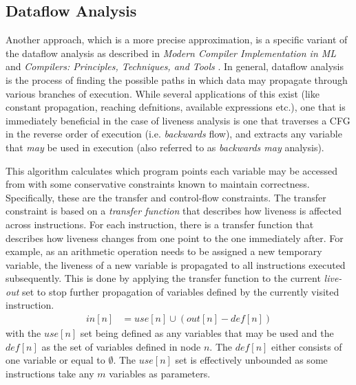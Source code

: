 \documentclass{article}
\begin{document}
\subsection{Dataflow Analysis}


Another approach, which is a more precise approximation, is a specific variant of the dataflow analysis as described in \textit{Modern Compiler Implementation in ML} \cite{tiger} and \textit{Compilers: Principles, Techniques, and Tools} \cite{dragon}. In general, dataflow analysis is the process of finding the possible paths in which data may propagate through various branches of execution.  While several applications of this exist (like constant propagation, reaching defnitions, available expressions etc.), one that is immediately beneficial in the case of liveness analysis is one that traverses a CFG in the reverse order of execution (i.e.  \textit{backwards} flow), and extracts any variable that \textit{may} be used in execution (also referred to as \textit{backwards may} analysis). %

This algorithm calculates which program points each variable may be accessed from with some conservative constraints known to maintain correctness. Specifically, these are the transfer and control-flow constraints. %
The transfer constraint is based on a \textit{transfer function} that describes how liveness is affected across instructions. For each instruction, there is a transfer function that describes how liveness changes from one point to the one immediately after. For example, as an arithmetic operation needs to be assigned a new temporary variable, the liveness of a new variable is propagated to all  instructions  executed subsequently. This is done by applying the transfer function to the current \textit{live-out} set to stop further propagation of variables defined by the currently visited instruction. %
\begin{align}\label{flowin}
  \mathit{in}\left[n\right] &= \mathit{use}\left[n\right] \cup (\mathit{out}\left[n\right] - \mathit{def}\left[n\right])
\end{align}
with the \(\mathit{use}[n]\) set being defined as any variables that may be used and the \(\mathit{def}[n]\) as the set of variables defined in node \(n\). The \(\mathit{def}[n]\) either consists of one variable or equal to \(\emptyset\). The  \(\mathit{use}[n]\) set is effectively unbounded as some instructions take any \(m\) variables as parameters.
\end{document}
